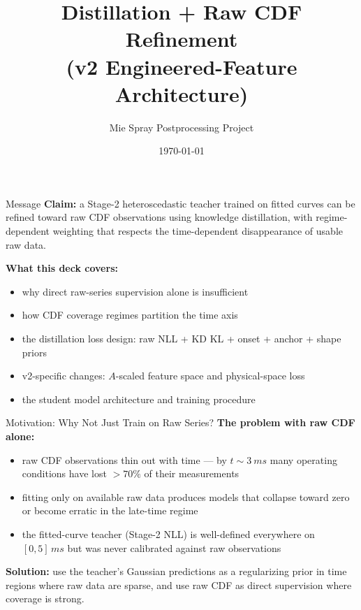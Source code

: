 \documentclass[UTF8,aspectratio=169]{ctexbeamer}
\title{Distillation + Raw CDF Refinement\\(v2 Engineered-Feature Architecture)}
\author{Mie Spray Postprocessing Project}
\date{\today}
\begin{document}
\begin{frame}
  \titlepage
\end{frame}

\begin{frame}{Message}
\textbf{Claim:} a Stage-2 heteroscedastic teacher trained on fitted curves can be refined toward raw CDF observations using knowledge distillation, with regime-dependent weighting that respects the time-dependent disappearance of usable raw data.

\vspace{0.4em}
\textbf{What this deck covers:}
\begin{itemize}
  \item why direct raw-series supervision alone is insufficient
  \item how CDF coverage regimes partition the time axis
  \item the distillation loss design: raw NLL + KD KL + onset + anchor + shape priors
  \item v2-specific changes: $A$-scaled feature space and physical-space loss
  \item the student model architecture and training procedure
\end{itemize}
\end{frame}

\begin{frame}{Motivation: Why Not Just Train on Raw Series?}
\textbf{The problem with raw CDF alone:}
\begin{itemize}
  \item raw CDF observations thin out with time --- by $t\sim\SI{3}{ms}$ many operating conditions have lost $>70\%$ of their measurements
  \item fitting only on available raw data produces models that collapse toward zero or become erratic in the late-time regime
  \item the fitted-curve teacher (Stage-2 NLL) is well-defined everywhere on $[0, 5]\,\si{ms}$ but was never calibrated against raw observations
\end{itemize}

\vspace{0.3em}
\textbf{Solution:} use the teacher's Gaussian predictions as a regularizing prior in time regions where raw data are sparse, and use raw CDF as direct supervision where coverage is strong.
\end{frame}
\end{document}
